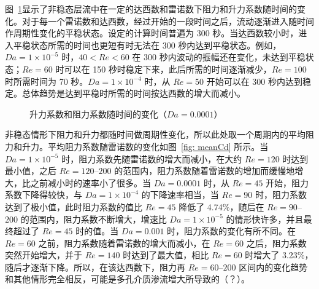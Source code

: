 图~\ref{fig: ClCd_t-1e-4}显示了非稳态层流中在一定的达西数和雷诺数下阻力和升力系数随时间的变化。对于每一个雷诺数和达西数，经过开始的一段时间之后，流动逐渐进入随时间作周期性变化的平稳状态。设定的计算时间普遍为 300 秒。当达西数较小时，进入平稳状态所需的时间也更短有时无法在 300 秒内达到平稳状态。例如，$Da=1\times 10^{-5}$ 时，$40<Re<60$ 在 300 秒内波动的振幅还在变化，未达到平稳状态；$Re=60$ 时可以在 150 秒时稳定下来，此后所需的时间逐渐减少，$Re=100$ 时所需时间为 70 秒。$Da=1\times 10^{-4}$ 时，从 $Re=50$ 开始可以在 300 秒内达到稳定。总体趋势是达到平稳时所需的时间按达西数的增大而减小。

\begin{figure}
	\setlength{\subfigcapskip}{-1bp}
	\centering
	\begin{minipage}{\textwidth}
		\centering
	\end{minipage}
	\centering
	\begin{minipage}{\textwidth}
		\centering
	\end{minipage}
	\centering
	\begin{minipage}{\textwidth}
		\centering
	\end{minipage}
	\centering
	\begin{minipage}{\textwidth}
		\centering
	\end{minipage}
	\vspace{0.2em}
	\caption{升力系数和阻力系数随时间的变化（$Da=0.0001$）}
	\label{fig: ClCd_t-1e-4}
\end{figure}

非稳态情形下阻力和升力都随时间做周期性变化，所以此处取一个周期内的平均阻力和升力。平均阻力系数随雷诺数的变化如图~\ref{fig: meanCd} 所示。当 $Da=1\times 10^{-5}$ 时，阻力系数先随雷诺数的增大而减小，在大约 $Re=120$ 时达到最小值，之后 $Re=120$--$200$ 的范围内，阻力系数随着雷诺数的增加而缓慢地增大，比之前减小时的速率小了很多。当 $Da=0.0001$ 时，从 $Re=45$ 开始，阻力系数下降得较快，与 $Da=1\times 10^{-4}$ 的下降速率相当，当 $Re=90$ 时，阻力系数达到了极小值，此时阻力系数的值比 $Re=45$ 降低了 4.74\%，随后在 $Re=90$--$200$ 的范围内，阻力系数不断增大，增速比 $Da=1\times 10^{-5}$ 的情形快许多，并且最终超过了 $Re=45$ 时的值。当 $Da=0.001$ 时，阻力系数的变化有所不同。在 $Re=60$ 之前，阻力系数随着雷诺数的增大而减小，在 $Re=60$ 之后，阻力系数突然开始增大，并于 $Re=140$ 时达到了最大值，相比 $Re=60$ 时增大了 3.23\%，随后才逐渐下降。所以，在该达西数下，阻力再 $Re=60$--$200$ 区间内的变化趋势和其他情形完全相反，可能是多孔介质渗流增大所导致的（？）。

